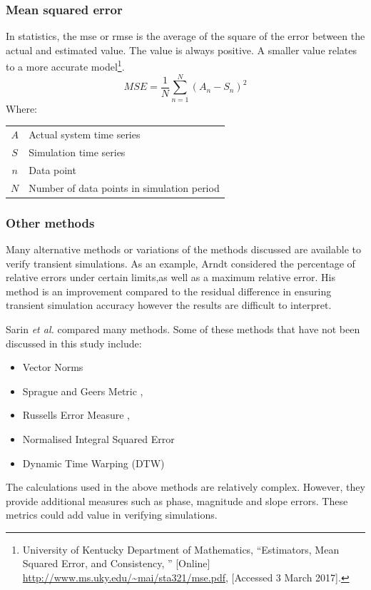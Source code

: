  		\subsubsection{Mean squared error}	
 		In statistics, the \gls{mse} or \gls{rmse} is the average of the square of the error between the actual and estimated value. The value is always positive. A smaller value relates to a more accurate model\footnote{University of Kentucky Department of Mathematics, \enquote{Estimators, Mean Squared Error, and
 			Consistency, } [Online] \url{http://www.ms.uky.edu/~mai/sta321/mse.pdf}, [Accessed 3 March 2017].}.
 			\begin{equation}
 				\label{eq: rmse}
 				MSE = \dfrac{1}{N}\sum_{n=1}^{N}{(A_{n} - S_{n})^2}
 			\end{equation}
 			Where: \par
 			\begin{table}[!htbp]
 				\centering
 				\begin{tabular}{cl}
 					$A$ & Actual system time series \\
 					$S$ & Simulation time series \\
 					$n$ & Data point \\
 					$N$ & Number of data points in simulation period \\
 			\end{tabular} 
 			\end{table}			
 		\subsubsection{Other methods}
 		Many alternative methods or variations of the methods discussed are available to verify transient simulations. As an example, Arndt \cite{arndt2007integrated} considered the percentage of relative errors under certain limits,as well as a maximum relative error. His method is an improvement compared to the residual difference in ensuring transient simulation accuracy however the results are difficult to interpret.
 		\par
 		Sarin \textit{et al.} \cite{sarin2010comparing} compared many methods. Some of these methods that have not been discussed in this study include:
 		\begin{itemize}
 			\item Vector Norms
 			\item Sprague and Geers Metric \cite{Geers1984Objective}, \cite{Sprague2004Spectral}
 			\item Russells Error Measure \cite{Russell1}, \cite{Russell2}
 			\item Normalised Integral Squared Error
 			\item Dynamic Time Warping (DTW)
 		\end{itemize}
 		The calculations used in the above methods are relatively complex. However, they provide additional measures such as phase, magnitude and slope errors. These metrics could add value in verifying simulations.
